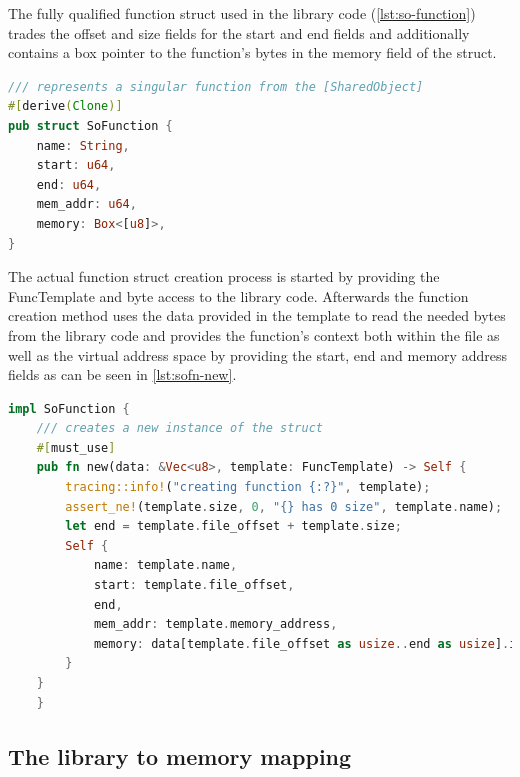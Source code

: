 The fully qualified function struct used in the library code (\autoref{lst:so-function}) trades the offset and size fields for the start and end fields and additionally contains a box pointer to the function's bytes in the memory field of the struct.
\begin{lstlisting}[caption=\label{lst:so-function}{The x86 shared object function struct}, language=Rust]
/// represents a singular function from the [SharedObject]
#[derive(Clone)]
pub struct SoFunction {
    name: String,
    start: u64,
    end: u64,
    mem_addr: u64,
    memory: Box<[u8]>,
}
\end{lstlisting}
The actual function struct creation process is started by providing the FuncTemplate and byte access to the library code. 
Afterwards the function creation method uses the data provided in the template to read the needed bytes from the library code and provides the function's context both within the file as well as the virtual address space by providing the start, end and memory address fields as can be seen in \autoref{lst:sofn-new}. 
\begin{lstlisting}[caption=\label{lst:sofn-new}{The x86 function parsing method}, language=Rust]
    impl SoFunction {
    /// creates a new instance of the struct
    #[must_use]
    pub fn new(data: &Vec<u8>, template: FuncTemplate) -> Self {
        tracing::info!("creating function {:?}", template);
        assert_ne!(template.size, 0, "{} has 0 size", template.name);
        let end = template.file_offset + template.size;
        Self {
            name: template.name,
            start: template.file_offset,
            end,
            mem_addr: template.memory_address,
            memory: data[template.file_offset as usize..end as usize].into(),
        }
    }
    }
\end{lstlisting}

\subsection{The library to memory mapping}

